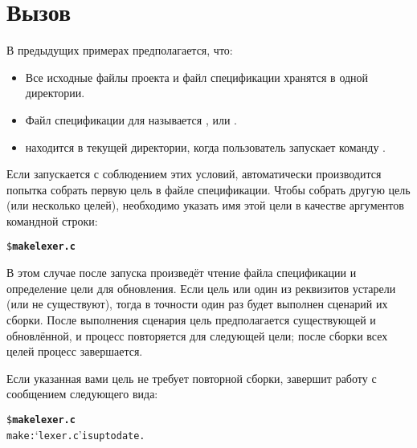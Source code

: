 \section{Вызов \GNUmake{}}
\label{sec:invoking_make}

В предыдущих примерах предполагается, что:
\begin{itemize}
\item Все исходные файлы проекта и файл спецификации \GNUmake{}
хранятся в одной директории.
\item Файл спецификации для \GNUmake{} называется
,  или .
\item \Makefile{} находится в текущей директории, когда пользователь
запускает команду \GNUmake{}.
\end{itemize}

Если \GNUmake{} запускается с соблюдением этих условий, автоматически
производится попытка собрать первую цель в файле спецификации. Чтобы
собрать другую цель (или несколько целей), необходимо указать имя
этой цели в качестве аргументов командной строки:

{\footnotesize
\begin{alltt}
\$ \textbf{make lexer.c}
\end{alltt}
}

В этом случае после запуска \GNUmake{} произведёт чтение файла
спецификации и определение цели для обновления. Если цель или один из
реквизитов устарели (или не существуют), тогда в точности один раз
будет выполнен сценарий их сборки. После выполнения сценария цель
предполагается существующей и обновлённой, и процесс повторяется для
следующей цели; после сборки всех целей процесс завершается.

Если указанная вами цель не требует повторной сборки, \GNUmake{}
завершит работу с сообщением следующего вида:

{\footnotesize
\begin{alltt}
\$ \textbf{make lexer.c}
make:  `lexer.c' is up to date.
\end{alltt}
}

